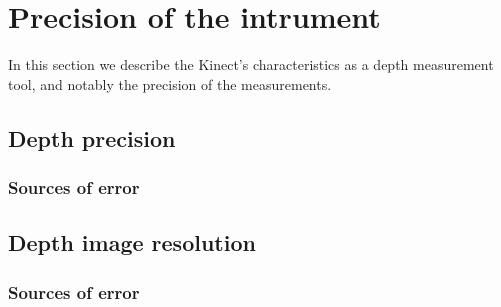 




\section{Precision of the intrument}
\label{precision}

In this section we describe the Kinect's characteristics as a depth measurement
tool, and notably the precision of the measurements.


\subsection{Depth precision}

\subsubsection{Sources of error}

\subsection{Depth image resolution}

\subsubsection{Sources of error}
